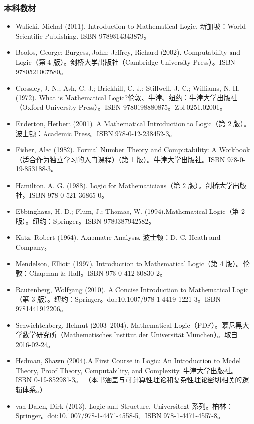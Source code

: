 \subsubsection{本科教材}
\begin{itemize}
  \item Walicki, Michał (2011). Introduction to Mathematical Logic. 新加坡：World Scientific Publishing. ISBN 9789814343879。
  \item Boolos, George; Burgess, John; Jeffrey, Richard (2002). Computability and Logic（第 4 版）。剑桥大学出版社（Cambridge University Press）。ISBN 9780521007580。
  \item Crossley, J. N.; Ash, C. J.; Brickhill, C. J.; Stillwell, J. C.; Williams, N. H. (1972). What is Mathematical Logic?伦敦、牛津、纽约：牛津大学出版社（Oxford University Press）。ISBN 9780198880875。Zbl 0251.02001。
  \item Enderton, Herbert (2001). A Mathematical Introduction to Logic（第 2 版）。波士顿：Academic Press。ISBN 978-0-12-238452-3。
  \item Fisher, Alec (1982). Formal Number Theory and Computability: A Workbook（适合作为独立学习的入门课程）（第 1 版）。牛津大学出版社。ISBN 978-0-19-853188-3。
  \item Hamilton, A. G. (1988). Logic for Mathematicians（第 2 版）。剑桥大学出版社。ISBN 978-0-521-36865-0。
  \item Ebbinghaus, H.-D.; Flum, J.; Thomas, W. (1994).Mathematical Logic（第 2 版）。纽约：Springer。ISBN 9780387942582。
  \item Katz, Robert (1964). Axiomatic Analysis. 波士顿：D. C. Heath and Company。
  \item Mendelson, Elliott (1997). Introduction to Mathematical Logic（第 4 版）。伦敦：Chapman \& Hall。ISBN 978-0-412-80830-2。
  \item Rautenberg, Wolfgang (2010). A Concise Introduction to Mathematical Logic（第 3 版）。纽约：Springer。doi:10.1007/978-1-4419-1221-3。ISBN 9781441912206。
  \item Schwichtenberg, Helmut (2003–2004). Mathematical Logic（PDF）。慕尼黑大学数学研究所（Mathematisches Institut der Universität München）。取自 2016-02-24。
  \item Hedman, Shawn (2004).A First Course in Logic: An Introduction to Model Theory, Proof Theory, Computability, and Complexity. 牛津大学出版社。ISBN 0-19-852981-3。  
  （本书涵盖与可计算性理论和复杂性理论密切相关的逻辑体系。）
  \item van Dalen, Dirk (2013). Logic and Structure. Universitext 系列。柏林：Springer。doi:10.1007/978-1-4471-4558-5。ISBN 978-1-4471-4557-8。
\end{itemize}
